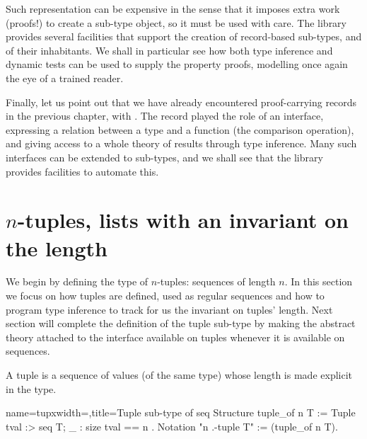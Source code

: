 Such representation can be expensive in the sense that it imposes
extra work (proofs!) to create a sub-type object, so it must be used
with care.  The \mcbMC{} library provides several facilities that
support the creation of record-based sub-types, and of their
inhabitants.  We shall in particular see how both type inference and
dynamic tests can be used to supply the property proofs, modelling
once again the eye of a trained reader.

Finally, let us point out that we have already encountered proof-carrying
records in the previous chapter, with .
The  record played the role of an interface,
expressing a relation between a type and a function (the comparison operation),
and giving access to a whole theory of results through type inference.
Many such interfaces can be extended to sub-types, and we shall see that
the \mcbMC{} library provides facilities to automate this.

\section{$n$-tuples, lists with an invariant on the length}
\label{sec:tupleinvariant}

We begin by defining the type of $n$-tuples: sequences of length $n$.
In this section we focus on how tuples are defined, used as regular
sequences and how to program type inference to track for us the
invariant on tuples' length.  Next section will complete the
definition of the tuple sub-type by making the abstract theory
attached to the  interface available on tuples whenever it is
available on sequences.

A tuple is a sequence of values (of the same type) whose length is
made explicit in the type.

\begin{coq}{name=tupx}{width=\textwidth,title=Tuple sub-type of seq}
Structure tuple_of n T :=  Tuple { tval :> seq T; _ : size tval == n }.
Notation "n .-tuple T" := (tuple_of n T).
\end{coq}


